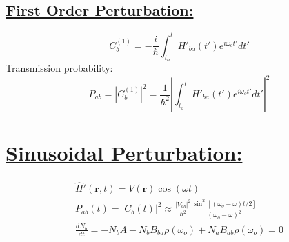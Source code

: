 \subsection*{\underline{First Order Perturbation:}}
\begin{equation*}
	C_b^{(1)} = -\frac{i}{\hbar}\int^t_{t_o}{H'_{ba}(t')e^{i\omega_ot'} dt'}
\end{equation*}
Transmission probability:
\begin{equation*}
	P_{ab} = \left|C_b^{(1)}\right|^2 = \frac{1}{\hbar^2}\left|\int^t_{t_o}{H'_{ba}(t')e^{i\omega_ot'} dt'}\right|^2
\end{equation*}

\section*{\underline{Sinusoidal Perturbation:}}
\begin{gather*}
	\hat{H}'(\textbf{r},t) = V(\textbf{r})\cos{(\omega t)}\\
	P_{ab}(t) = |C_b(t)|^2 \approx \frac{|V_{ab}|^2}{\hbar^2}\frac{\sin^2{[(\omega_o - \omega)t/2]}}{(\omega_o-\omega)^2}\\
	\frac{dN_b}{dt} = -N_bA - N_bB_{ba}\rho(\omega_o) + N_aB_{ab}\rho(\omega_o) = 0
\end{gather*}
